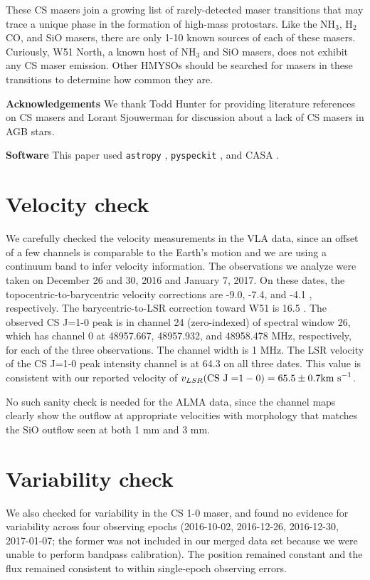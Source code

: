 \documentclass[twocolumn]{aastex62}
\begin{document}
These CS masers join a growing list of rarely-detected maser transitions
that may trace a unique phase in the formation of high-mass protostars.
Like the NH$_3$, H$_2$CO, and SiO masers, there are only 1-10 known sources of
each of these masers.  Curiously, W51 North, a known host of NH$_3$ and SiO masers,
does not exhibit any CS maser emission.  Other HMYSOs should be searched for
masers in these transitions to determine how common they are.

\textbf{Acknowledgements}
We thank Todd Hunter for providing literature references on CS masers and
Lorant Sjouwerman for discussion about a lack of CS masers in AGB stars.

\textbf{Software}
This paper used \texttt{astropy}
\citep{Astropy-Collaboration2013a,Astropy-Collaboration2018a},
\texttt{pyspeckit} \citep{Ginsburg2011c}, and CASA \citep{McMullin2007a}.

\appendix
\section{Velocity check}
We carefully checked the velocity measurements in the VLA data, since an offset
of a few channels is comparable to the Earth's motion and we are using a
continuum band to infer velocity information.  The observations we analyze were
taken on December 26 and 30, 2016 and January 7, 2017.  On these dates, the
topocentric-to-barycentric velocity corrections are -9.0, -7.4, and -4.1 \kms,
respectively.  The barycentric-to-LSR correction toward W51 is 16.5 \kms.  The
observed CS J=1-0 peak is in channel 24 (zero-indexed) of spectral window 26,
which has channel 0 at  48957.667, 48957.932, and 48958.478 MHz, respectively,
for each of the three observations.  The channel width is 1 MHz.  The LSR
velocity of the CS J=1-0 peak intensity channel is at 64.3 \kms on all three
dates.  This value is consistent with our reported velocity of
$v_{LSR}(\mathrm{CS~J=}1-0) = 65.5 \pm 0.7 \textrm{km~s}^{-1}$.

No such sanity check is needed for the ALMA data, since the channel maps
clearly show the outflow at appropriate velocities with morphology that matches
the SiO outflow seen at both 1 mm and 3 mm.

\section{Variability check}
We also checked for variability in the CS 1-0 maser, and found no evidence for
variability across four observing epochs (2016-10-02, 2016-12-26, 2016-12-30,
2017-01-07; the former was not included in our merged data set because we were unable
to perform bandpass calibration).  The position remained constant and the flux
remained consistent to within single-epoch observing errors.


\end{document}
